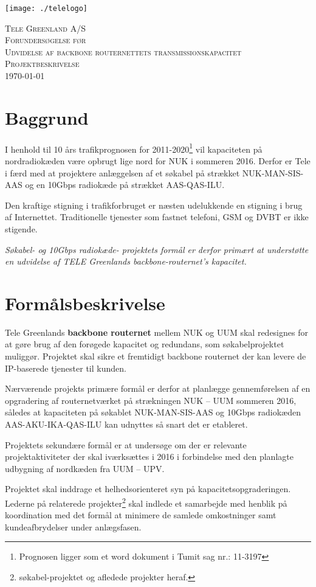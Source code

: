 \documentclass[11pt,a4paper]{article}
\begin{document}
\begin{flushright}
\texttt{[image: ./telelogo]}~\\[1cm] %
\end{flushright}
\begin{center}
\textsc{\LARGE Tele Greenland A/S}\\[1cm]
\textsc{\huge Forundersøgelse før} \\ [1cm]
\textsc{\huge Udvidelse af backbone routernettets transmissionskapacitet} \\ [1cm]\textsc{\Large Projektbeskrivelse}\\[0.5cm]
{\large \today} %
\end{center}

\tableofcontents

\section{Baggrund}
I henhold til 10 års trafikprognosen for 2011-2020\footnote{
Prognosen ligger som et word dokument i Tumit sag nr.: 11-3197
}
vil kapaciteten på nordradiokæden være opbrugt lige nord for NUK i sommeren 2016. Derfor er Tele i færd med at projektere anlæggelsen af et søkabel på strækket NUK-MAN-SIS-AAS og en 10Gbps radiokæde på strækket AAS-QAS-ILU.
\par
Den kraftige stigning i trafikforbruget er næsten udelukkende en stigning i brug af Internettet. Traditionelle tjenester som fastnet telefoni, GSM og DVBT er ikke stigende.
\par
{\em Søkabel- og 10Gbps radiokæde- projektets formål er derfor primært at understøtte en udvidelse af TELE Greenlands backbone-routernet's kapacitet.}
\section{Formålsbeskrivelse}
Tele Greenlands \textbf{backbone routernet} mellem NUK og UUM skal redesignes for at gøre brug af den forøgede kapacitet og redundans, som  søkabelprojektet muliggør. Projektet skal sikre et fremtidigt backbone routernet der kan levere de IP-baserede tjenester til kunden. 
\par
Nærværende projekts primære formål er derfor at planlægge gennemførelsen af en opgradering af routernetværket på strækningen NUK – UUM sommeren 2016, således at kapaciteten på søkablet NUK-MAN-SIS-AAS og 10Gbps radiokæden AAS-AKU-IKA-QAS-ILU kan udnyttes så snart det er etableret.
\par
Projektets sekundære formål er at undersøge om der er relevante projektaktiviteter der skal iværksættes i 2016 i forbindelse med den planlagte udbygning af nordkæden fra UUM – UPV.
\par
Projektet skal inddrage et helhedsorienteret syn på kapacitetsopgraderingen. Lederne på relaterede projekter\footnote{søkabel-projektet og afledede projekter heraf.} skal indlede et samarbejde med henblik på koordination med det formål at minimere de samlede omkostninger samt kundeafbrydelser under anlægsfasen.
\end{document}
